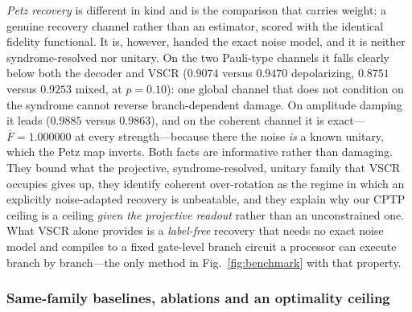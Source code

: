 \documentclass[aps,prxquantum,reprint,superscriptaddress]{revtex4-2}
\begin{document}
\emph{Petz recovery} is different in kind and is the comparison that carries
weight: a genuine recovery channel rather than an estimator, scored with the
identical fidelity functional. It is, however, handed the exact noise model, and
it is neither syndrome-resolved nor unitary. On the two Pauli-type channels it
falls clearly below both the decoder and VSCR ($0.9074$ versus $0.9470$
depolarizing, $0.8751$ versus $0.9253$ mixed, at $p=0.10$): one global channel
that does not condition on the syndrome cannot reverse branch-dependent damage.
On amplitude damping it leads ($0.9885$ versus $0.9863$), and on the coherent
channel it is exact---$\bar F=1.000000$ at every strength---because there the
noise \emph{is} a known unitary, which the Petz map inverts. Both facts are
informative rather than damaging. They bound what the projective,
syndrome-resolved, unitary family that VSCR occupies gives up, they identify
coherent over-rotation as the regime in which an explicitly noise-adapted
recovery is unbeatable, and they explain why our CPTP ceiling is a ceiling
\emph{given the projective readout} rather than an unconstrained one. What VSCR
alone provides is a \emph{label-free} recovery that needs no exact noise model and
compiles to a fixed gate-level branch circuit a processor can execute branch by
branch---the only method in Fig.~\ref{fig:benchmark} with that property.

\subsubsection*{Same-family baselines, ablations and an optimality ceiling}
\end{document}
